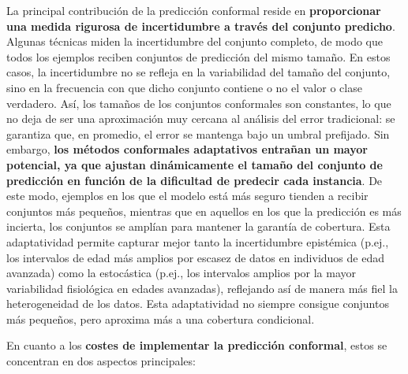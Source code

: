 
La principal contribución de la predicción conformal reside en \textbf{proporcionar una medida rigurosa de incertidumbre a través del conjunto predicho}. Algunas técnicas miden la incertidumbre del conjunto completo, de modo que todos los ejemplos reciben conjuntos de predicción del mismo tamaño. En estos casos, la incertidumbre no se refleja en la variabilidad del tamaño del conjunto, sino en la frecuencia con que dicho conjunto contiene o no el valor o clase verdadero. Así, los tamaños de los conjuntos conformales son constantes, lo que no deja de ser una aproximación muy cercana al análisis del error tradicional: se garantiza que, en promedio, el error se mantenga bajo un umbral prefijado.
Sin embargo, \textbf{los métodos conformales adaptativos entrañan un mayor potencial, ya que ajustan dinámicamente el tamaño del conjunto de predicción en función de la dificultad de predecir cada instancia}. De este modo, ejemplos en los que el modelo está más seguro tienden a recibir conjuntos más pequeños, mientras que en aquellos en los que la predicción es más incierta, los conjuntos se amplían para mantener la garantía de cobertura. 
Esta adaptatividad permite capturar mejor tanto la incertidumbre epistémica (p.ej., los intervalos de edad más amplios por escasez de datos en individuos de edad avanzada) como la estocástica (p.ej., los intervalos amplios por la mayor variabilidad fisiológica en edades avanzadas), reflejando así de manera más fiel la heterogeneidad de los datos. Esta adaptatividad no siempre consigue conjuntos más pequeños, pero aproxima más a una cobertura condicional.



En cuanto a los \textbf{costes de implementar la predicción conformal}, estos se concentran en dos aspectos principales:

